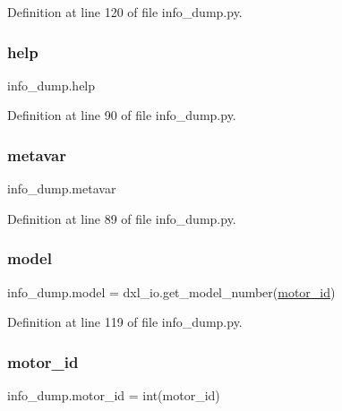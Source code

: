 Definition at line 120 of file info\+\_\+dump.\+py.

\mbox{\label{namespaceinfo__dump_aa86ebeaa3c5aac015d0d9c03879df060}} 
\subsubsection{\texorpdfstring{help}{help}}
{\footnotesize\ttfamily info\+\_\+dump.\+help}



Definition at line 90 of file info\+\_\+dump.\+py.

\mbox{\label{namespaceinfo__dump_a93b0fee6570e26a997d0deaf338fbec5}} 
\subsubsection{\texorpdfstring{metavar}{metavar}}
{\footnotesize\ttfamily info\+\_\+dump.\+metavar}



Definition at line 89 of file info\+\_\+dump.\+py.

\mbox{\label{namespaceinfo__dump_a7b8b18c2843714130e2cf0f9859565d7}} 
\subsubsection{\texorpdfstring{model}{model}}
{\footnotesize\ttfamily info\+\_\+dump.\+model = dxl\+\_\+io.\+get\+\_\+model\+\_\+number(\hyperlink{namespaceinfo__dump_ab8304b7617ad78e51a49ee40b5f2f3fc}{motor\+\_\+id})}



Definition at line 119 of file info\+\_\+dump.\+py.

\mbox{\label{namespaceinfo__dump_ab8304b7617ad78e51a49ee40b5f2f3fc}} 
\subsubsection{\texorpdfstring{motor\+\_\+id}{motor\_id}}
{\footnotesize\ttfamily info\+\_\+dump.\+motor\+\_\+id = int(motor\+\_\+id)}



